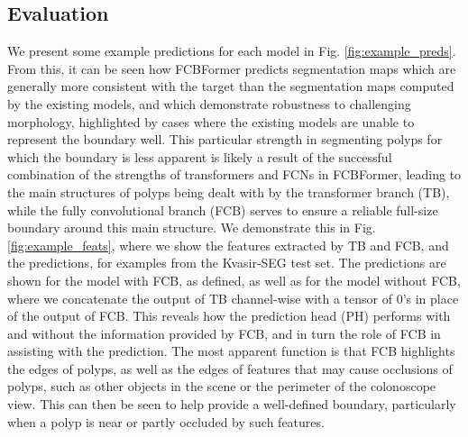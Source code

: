 \documentclass[runningheads]{llncs}
\begin{document}
\subsection{Evaluation}
We present some example predictions for each model in Fig. \ref{fig:example_preds}. From this, it can be seen how FCBFormer predicts segmentation maps which are generally more consistent with the target than the segmentation maps computed by the existing models, and which demonstrate robustness to challenging morphology, highlighted by cases where the existing models are unable to represent the boundary well. This particular strength in segmenting polyps for which the boundary is less apparent is likely a result of the successful combination of the strengths of transformers and FCNs in FCBFormer, leading to the main structures of polyps being dealt with by the transformer branch (TB), while the fully convolutional branch (FCB) serves to ensure a reliable full-size boundary around this main structure. We demonstrate this in Fig. \ref{fig:example_feats}, where we show the features extracted by TB and FCB, and the predictions, for examples from the Kvasir-SEG \cite{kvasir} test set. The predictions are shown for the model with FCB, as defined, as well as for the model without FCB, where we concatenate the output of TB channel-wise with a tensor of 0's in place of the output of FCB. This reveals how the prediction head (PH) performs with and without the information provided by FCB, and in turn the role of FCB in assisting with the prediction. The most apparent function is that FCB highlights the edges of polyps, as well as the edges of features that may cause occlusions of polyps, such as other objects in the scene or the perimeter of the colonoscope view. This can then be seen to help provide a well-defined boundary, particularly when a polyp is near or partly occluded by such features.
\end{document}
